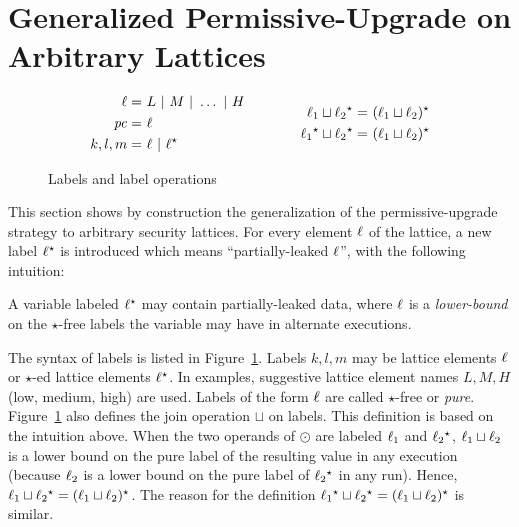 \section{Generalized Permissive-Upgrade on Arbitrary Lattices}
\label{sec:gen:pus}

\begin{figure}
\begin{equation*}
\begin{aligned}[c]
\ell          =~& L~\arrowvert~M~\arrowvert~\ldots~\arrowvert~H\\
\mathit{pc}          =~& \ell \\
k,l,m =~& \ell~\arrowvert~\ell{}^\star 
\end{aligned}
\qquad \qquad 
\begin{aligned}[c]
\ell_1 \sqcup \ell_2{}^\star  =~&(\ell_1 \sqcup \ell_2){}^\star \\
\ell_1{}^\star  \sqcup \ell_2{}^\star  =~&(\ell_1 \sqcup \ell_2){}^\star
\end{aligned}
\end{equation*}
\caption{Labels and label operations}\label{fig:labels}
\end{figure}

This section shows by construction the generalization of the
permissive-upgrade strategy to arbitrary security lattices. For every
element $\ell$ of the lattice, a new label $\ell{}^\star$ is introduced
which means ``partially-leaked $\ell$'', with the following intuition: 
\begin{framed}
\noindent
A variable labeled $\ell{}^\star$ may contain partially-leaked data, where
$\ell$ is a \emph{lower-bound} on the $\star$-free labels the variable
may have in alternate executions.
\end{framed}

The syntax of labels is listed in Figure~\ref{fig:labels}. Labels
$k,l,m$ may be lattice elements $\ell$ or $\star$-ed lattice elements
$\ell{}^\star$. In examples, suggestive lattice element names $L, M, H$
(low, medium, high) are used. Labels of the form $\ell$ are called 
$\star$-free or \emph{pure}. Figure~\ref{fig:labels} also defines the
join operation $\sqcup$ on labels. This definition is based on the intuition
above. When the two operands of $\odot$ are labeled $\ell_1$ and
$\ell_2{}^\star$, $\ell_1 \sqcup \ell_2$ is a lower bound on the pure label
of the resulting value in any execution (because $\ell_2$ is a lower
bound on the pure label of $\ell_2{}^\star$ in any run). Hence, $\ell_1
\sqcup \ell_2{}^\star = (\ell_1 \sqcup \ell_2){}^\star$. The reason for the
definition $\ell_1{}^\star \sqcup \ell_2{}^\star = (\ell_1 \sqcup \ell_2){}^\star$ is
similar.

